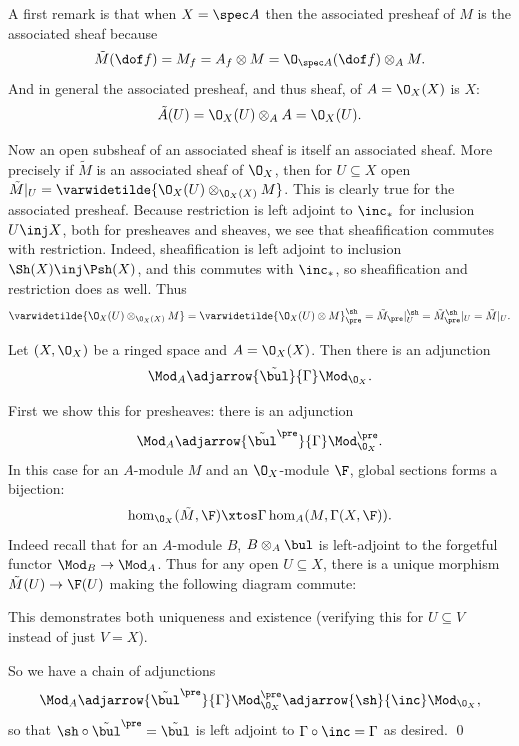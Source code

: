 A first remark is that when $X=\spec A$ then the associated presheaf of $M$ is the associated sheaf because
$$ \tilde M(\dof f) = M_f = A_f\otimes M = \O_{\spec A}(\dof f)\otimes_AM . $$
And in general the associated presheaf, and thus sheaf, of $A=\O_X(X)$ is $X$:
$$ \tilde A(U) = \O_X(U)\otimes_AA = \O_X(U) . $$

Now an open subsheaf of an associated sheaf is itself an associated sheaf.
More precisely if $\tilde M$ is an associated sheaf of $\O_X$, then for $U\subseteq X$ open $\tilde M|_U=\varwidetilde{\O_X(U)\otimes_{\O_X(X)}M}$.
This is clearly true for the associated presheaf.
Because restriction is left adjoint to $\inc_*$ for inclusion $U\inj X$, both for presheaves and sheaves, we see that sheafification commutes with restriction.
Indeed, sheafification is left adjoint to inclusion $\Sh(X)\inj\Psh(X)$, and this commutes with $\inc_*$, so sheafification and restriction does as well.
Thus
$$ \varwidetilde{\O_X(U)\otimes_{\O_X(X)}M} = \varwidetilde{\O_X(U)\otimes M}_\pre^\sh = \tilde M_\pre|_U^\sh = \tilde M_\pre^\sh|_U = \tilde M|_U . $$

\bprop

    Let $(X,\O_X)$ be a ringed space and $A=\O_X(X)$.
    Then there is an adjunction
    $$ \Mod_A \adjarrow{\tilde\bul}{\Gamma} \Mod_{\O_X} . $$

\eprop

\bproof

    First we show this for presheaves: there is an adjunction
    $$ \Mod_A \adjarrow{\tilde\bul^\pre}{\Gamma} \Mod^\pre_{\O_X} . $$
    In this case for an $A$-module $M$ and an $\O_X$-module $\F$, global sections forms a bijection:
    $$ \hom_{\O_X}(\tilde M,\F) \xtos\Gamma \hom_A(M,\Gamma(X,\F)) . $$
    Indeed recall that for an $A$-module $B$, $B\otimes_A\bul$ is left-adjoint to the forgetful functor $\Mod_B\to\Mod_A$.
    Thus for any open $U\subseteq X$, there is a unique morphism $\tilde M(U)\to\F(U)$ making the following diagram commute:


    This demonstrates both uniqueness and existence (verifying this for $U\subseteq V$ instead of just $V=X$).

    So we have a chain of adjunctions
    $$ \Mod_A \adjarrow{\tilde\bul^\pre}{\Gamma} \Mod^\pre_{\O_X} \adjarrow{\sh}{\inc} \Mod_{\O_X} , $$
    so that $\sh\circ\tilde\bul^\pre=\tilde\bul$ is left adjoint to $\Gamma\circ\inc=\Gamma$ as desired.
    \qed


